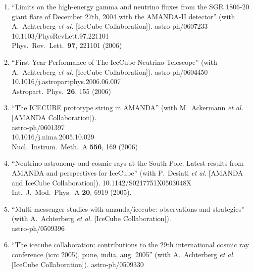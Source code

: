 \begin{enumerate}
\item ``Limits on the high-energy gamma and neutrino fluxes from the SGR
  1806-20 giant flare of December 27th, 2004 with the AMANDA-II
  detector'' (with A.~Achterberg {\it et al.}  [IceCube Collaboration]). astro-ph/0607233 \\{}10.1103/PhysRevLett.97.221101
  \\{}Phys.\ Rev.\ Lett.\ {\bf 97}, 221101 (2006) %


\item ``First Year Performance of The IceCube Neutrino Telescope'' (with A.~Achterberg {\it et al.}  [IceCube Collaboration]). astro-ph/0604450 \\{}10.1016/j.astropartphys.2006.06.007
  \\{}Astropart.\ Phys.\ {\bf 26}, 155 (2006) %


\item ``The ICECUBE prototype string in AMANDA'' (with M.~Ackermann {\it et
  al.}  [AMANDA Collaboration]).  \\{}astro-ph/0601397
  \\{}10.1016/j.nima.2005.10.029 \\{}Nucl.\ Instrum.\ Meth.\ A {\bf
    556}, 169 (2006) %


\item ``Neutrino astronomy and cosmic rays at the South Pole: Latest results
  from AMANDA and perspectives for IceCube'' (with P.~Desiati {\it et
    al.}  [AMANDA and IceCube Collaboration]). 10.1142/S0217751X0503048X \\{}Int.\ J.\ Mod.\ Phys.\ A {\bf 20},
  6919 (2005). %


\item ``Multi-messenger studies with amanda/icecube: observations and
  strategies'' (with A.~Achterberg {\it et al.}  [IceCube
    Collaboration]).  \\{}astro-ph/0509396
  


\item ``The icecube collaboration: contributions to the 29th international
  cosmic ray conference (icrc 2005), pune, india, aug. 2005'' (with A.~Achterberg {\it et al.}  [IceCube Collaboration]). astro-ph/0509330
  

\end{enumerate}
